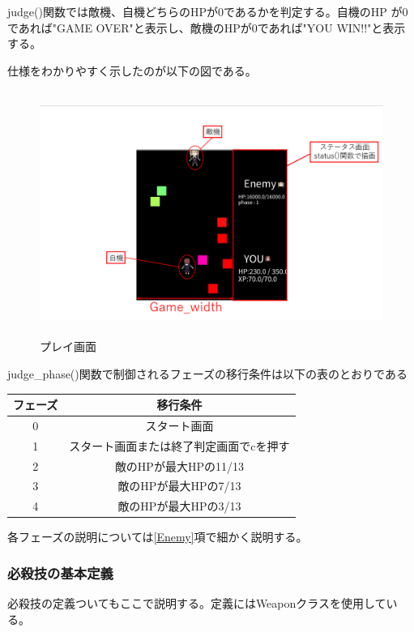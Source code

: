 \documentclass[a4paper,titlepage,11pt]{ltjsarticle}
\begin{document}
judge()関数では敵機、自機どちらのHPが0であるかを判定する。自機のHP
が0であれば"GAME OVER"と表示し、敵機のHPが0であれば"YOU WIN!!"と表示する。

仕様をわかりやすく示したのが以下の図である。
\begin{figure}[H]
\begin{center}
\includegraphics*[height = 8cm]{playing_phase1.png}
\caption{プレイ画面}
\end{center}
\end{figure}

judge\_phase()関数で制御されるフェーズの移行条件は以下の表のとおりである
\begin{table}[H]
	\centering
	\begin{tabular}{|c|c|}
		\hline
		フェーズ & 移行条件\\ \hline \hline
		0 & スタート画面 \\ \hline
		1 & スタート画面または終了判定画面でcを押す \\ \hline
		2 & 敵のHPが最大HPの11/13\\ \hline
		3 & 敵のHPが最大HPの7/13 \\ \hline
		4 & 敵のHPが最大HPの3/13 \\ \hline
	\end{tabular}
\end{table}
各フェーズの説明については\ref{Enemy}項で細かく説明する。
\subsubsection{必殺技の基本定義}
必殺技の定義ついてもここで説明する。定義にはWeaponクラスを使用している。
\end{document}
